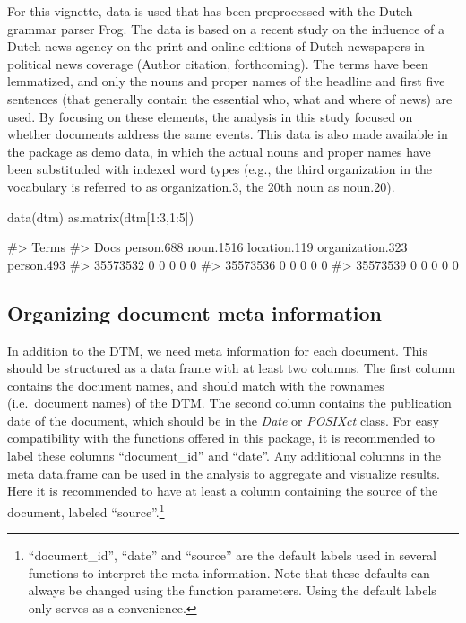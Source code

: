For this vignette, data is used that has been preprocessed with the
Dutch grammar parser Frog. The data is based on a recent study on the
influence of a Dutch news agency on the print and online editions of
Dutch newspapers in political news coverage (Author citation,
forthcoming). The terms have been lemmatized, and only the nouns and
proper names of the headline and first five sentences (that generally
contain the essential who, what and where of news) are used. By focusing
on these elements, the analysis in this study focused on whether
documents address the same events. This data is also made available in
the package as demo data, in which the actual nouns and proper names
have been substituded with indexed word types (e.g., the third
organization in the vocabulary is referred to as organization.3, the
20th noun as noun.20).

\begin{Schunk}
\begin{Sinput}
data(dtm)
as.matrix(dtm[1:3,1:5])
\end{Sinput}
\begin{Soutput}
#>           Terms
#> Docs       person.688 noun.1516 location.119 organization.323 person.493
#>   35573532          0         0            0                0          0
#>   35573536          0         0            0                0          0
#>   35573539          0         0            0                0          0
\end{Soutput}
\end{Schunk}

\subsection{Organizing document meta information}

In addition to the DTM, we need meta information for each document. This
should be structured as a data frame with at least two columns. The
first column contains the document names, and should match with the
rownames (i.e.~document names) of the DTM. The second column contains
the publication date of the document, which should be in the \emph{Date}
or \emph{POSIXct} class. For easy compatibility with the functions
offered in this package, it is recommended to label these columns
``document\_id'' and ``date''. Any additional columns in the meta
data.frame can be used in the analysis to aggregate and visualize
results. Here it is recommended to have at least a column containing the
source of the document, labeled ``source''.\footnote{``document\_id'',
  ``date'' and ``source'' are the default labels used in several
  functions to interpret the meta information. Note that these defaults
  can always be changed using the function parameters. Using the default
  labels only serves as a convenience.}

